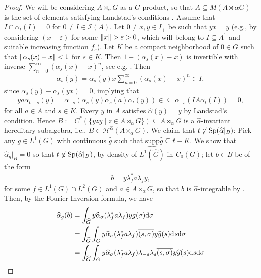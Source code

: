 \begin{proof}
	We will be considering $A \rtimes_\alpha G$ as a $G$-product, so that $A \subseteq M(A \rtimes\alpha G)$ is the set of elements satisfying Landstad's conditions . Assume that $I \cap \alpha_t(I) = 0$ for $0 \neq I \in \mathcal{I}(A)$.  Let $0 \neq x,y \in I_+$ be such that $yx=y$ (e.g., by considering $(x-\varepsilon)$ for some $ \left\lVert x \right\rVert >\varepsilon > 0$, which will belong to $I \subseteq A^1$ and suitable increasing function $f_\varepsilon$). Let $K$ be a compact neighborhood of $0 \in G$ such that $ \left\lVert \alpha_s(x)-x	\right\rVert < 1$ for $s \in K$. Then $1-(\alpha_s(x)-x)$ is invertible with inverse $\sum_{n=0}^\infty (\alpha_s(x)-x)^n$, see e.g. \cite[Proposition 2.1]{zhu}. Then
	\begin{align*}
		\alpha_s(y)=\alpha_s(y)x \sum_{n=0}^\infty (\alpha_s(x)-x)^n \in I,
	\end{align*}
	since $\alpha_s(y)-\alpha_s(yx)=0$, implying that 
	\begin{align*}
	y a \alpha_{t-s}(y) = \alpha_{-s}(\alpha_s(y)\alpha_s(a)\alpha_t(y)) \in \subseteq \alpha_{-s}(I A \alpha_t(I)) = 0,
	\end{align*}
	for all $a \in A$ and $s \in K$. Every $y$ in $A$ satisfies $\hat\alpha(y) = y$ by Landstad's condition. Hence $B:= C^*(\{y z y \mid z \in A \rtimes_\alpha G\}) \subseteq A \rtimes_\alpha G$ is a $\hat \alpha$-invariant hereditary subalgebra, i.e., $B \in \mathscr{H}^{\hat \alpha}(A \rtimes_\alpha G)$. We claim that $t \not \in \mathrm{Sp}(\widehat{\alpha} |_B)$: Pick any $g \in L^1(G)$ with continuous $\hat g$ such that $\mathrm{supp} \hat g \subseteq t-K$. We show that $\hat \alpha_g |_B = 0$ so that $t \not\in \mathrm{Sp}(\widehat{\alpha}|_B)$, by density of $\hat {L^1(\hat G)}$ in $C_0(G)$; let $b \in B$ be of the form
	\begin{align*}
		b = y \lambda_f^* a \lambda_f y,
	\end{align*}
	for some $f \in L^1(G) \cap L^2(G)$ and $ a \in A \rtimes_\alpha G$, so that $b$ is $\hat \alpha$-integrable by . Then, by the Fourier Inversion formula, we have 
	\begin{align*}
		\hat \alpha_g(b) &= \int_{\hat G} y \hat \alpha_\sigma(\lambda_f^* a \lambda_f) y g(\sigma) \d \sigma \\
		&= \int_{\hat G} \int_G y \hat \alpha_\sigma(\lambda_f^* a \lambda_f) \overline{(s,\sigma)} y \hat g(s) \d s \d \sigma\\
		&= \int_{\hat G} \int_G y \hat \alpha_\sigma(\lambda_f^* a \lambda_f) \lambda_{-s} \lambda_s \overline{(s,\sigma)} y \hat g(s) \d s \d \sigma\\

\end{align*}
\end{proof}
